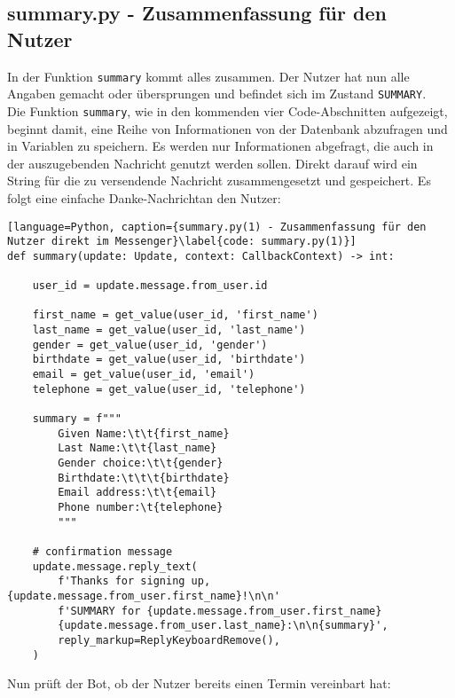         \subsection{summary.py - Zusammenfassung für den Nutzer} \label{Implementierung: summary.py}
            In der Funktion \verb|summary| kommt alles zusammen. Der Nutzer hat nun alle Angaben gemacht oder übersprungen und befindet sich im Zustand \verb|SUMMARY|. \\
            Die Funktion \verb|summary|, wie in den kommenden vier Code-Abschnitten aufgezeigt, beginnt damit, eine Reihe von Informationen von der Datenbank abzufragen und in Variablen zu speichern. Es werden nur Informationen abgefragt, die auch in der auszugebenden Nachricht genutzt werden sollen. Direkt darauf wird ein String für die zu versendende Nachricht zusammengesetzt und gespeichert. Es folgt eine einfache \glqq Danke-Nachricht\grqq an den Nutzer:

            \begin{lstlisting}[language=Python, caption={summary.py(1) - Zusammenfassung für den Nutzer direkt im Messenger}\label{code: summary.py(1)}]
def summary(update: Update, context: CallbackContext) -> int:
    
    user_id = update.message.from_user.id    

    first_name = get_value(user_id, 'first_name')
    last_name = get_value(user_id, 'last_name')
    gender = get_value(user_id, 'gender')
    birthdate = get_value(user_id, 'birthdate')
    email = get_value(user_id, 'email')
    telephone = get_value(user_id, 'telephone')

    summary = f"""
        Given Name:\t\t{first_name}
        Last Name:\t\t{last_name}
        Gender choice:\t\t{gender}
        Birthdate:\t\t\t{birthdate}
        Email address:\t\t{email}
        Phone number:\t{telephone}
        """

    # confirmation message
    update.message.reply_text(
        f'Thanks for signing up, {update.message.from_user.first_name}!\n\n'
        f'SUMMARY for {update.message.from_user.first_name} 
        {update.message.from_user.last_name}:\n\n{summary}',
        reply_markup=ReplyKeyboardRemove(),
    )
            \end{lstlisting}
            Nun prüft der Bot, ob der Nutzer bereits einen Termin vereinbart hat:
            
